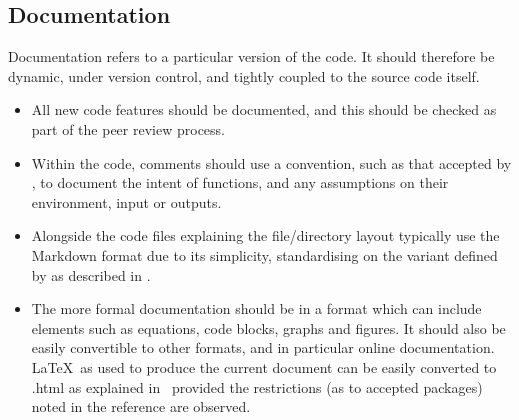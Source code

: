 
\subsection{Documentation} \label{sec:doc}

Documentation refers to a particular version of the code. It should therefore be
dynamic, under version control, and tightly coupled to the source code itself. 

\begin{itemize}
\item All new code features should be documented, and this should be checked as
part of the peer review process.
\item Within the code, comments should use a convention, such as that
accepted by ,
to document the intent of functions, and any assumptions on their
environment, input or outputs.
\item Alongside the code  files explaining the file/directory layout 
typically use the Markdown format due to its simplicity,
standardising on the variant defined by  as described in \cite{y2d34}.
\item The more formal documentation should be in a format which can
include elements such as equations, code blocks, graphs and figures.
It should also be easily convertible to other formats, and in
particular online documentation. \LaTeX \ as used to produce the current document
can be easily converted to .html as explained in~\cite{y2d34} provided
the restrictions (as to accepted packages) noted in the reference are observed.
\end{itemize}

